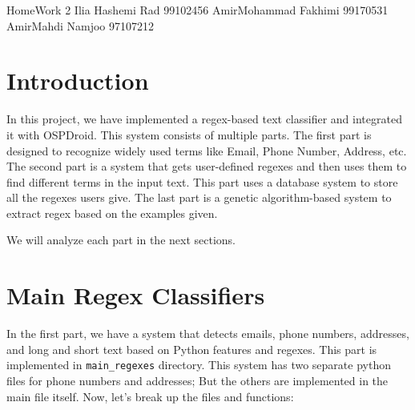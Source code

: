 \documentclass{solutionclass} %
\begin{document}
\pretitle
{HomeWork 2} %
{Ilia Hashemi Rad}
{99102456}
{AmirMohammad Fakhimi}
{99170531}
{AmirMahdi Namjoo}
{97107212}

\def\homeworkNumber{2}

\makeatletter
    \startcontents[sections]
\makeatother
    \def\Solu{Explanations}

\section{Introduction}

\begin{solution}
In this project, we have implemented a regex-based text classifier and integrated it with OSPDroid. This system consists of multiple parts. The first part is designed to recognize widely used terms like Email, Phone Number, Address, etc. The second part is a system that gets user-defined regexes and then uses them to find different terms in the input text. This part uses a database system to store all the regexes users give. The last part is a genetic algorithm-based system to extract regex based on the examples given.

We will analyze each part in the next sections.
\end{solution}


\section{Main Regex Classifiers}

\begin{solution}
In the first part, we have a system that detects emails, phone numbers, addresses, and long and short text based on Python features and regexes. This part is implemented in \verb*|main_regexes| directory. This system has two separate python files for phone numbers and addresses; But the others are implemented in the main file itself. Now, let's break up the files and functions:
\end{solution}
\end{document}
